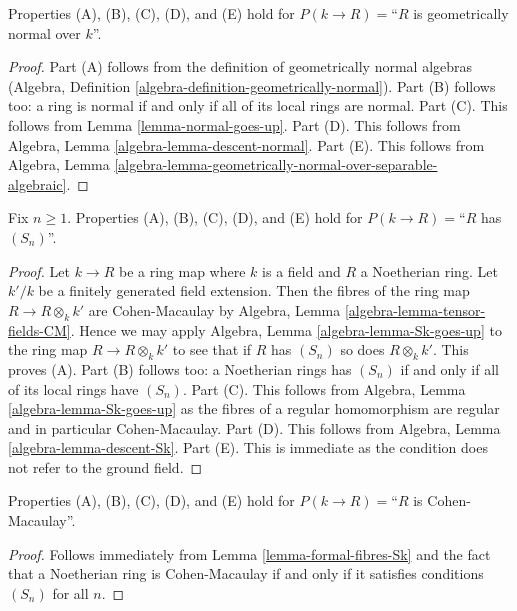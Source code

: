 \begin{lemma}
\label{lemma-formal-fibres-normal}
Properties (A), (B), (C), (D), and (E) hold for
$P(k \to R) =$``$R$ is geometrically normal over $k$''.
\end{lemma}

\begin{proof}
Part (A) follows from the definition of geometrically normal
algebras (Algebra, Definition \ref{algebra-definition-geometrically-normal}).
Part (B) follows too: a ring is normal if and only if all of its
local rings are normal.
Part (C). This follows from Lemma \ref{lemma-normal-goes-up}.
Part (D). This follows from Algebra, Lemma \ref{algebra-lemma-descent-normal}.
Part (E). This follows from Algebra, Lemma
\ref{algebra-lemma-geometrically-normal-over-separable-algebraic}.
\end{proof}

\begin{lemma}
\label{lemma-formal-fibres-Sk}
Fix $n \geq 1$. Properties (A), (B), (C), (D), and (E) hold for
$P(k \to R) =$``$R$ has $(S_n)$''.
\end{lemma}

\begin{proof}
Let $k \to R$ be a ring map where $k$ is a field and $R$ a Noetherian
ring. Let $k'/k$ be a finitely generated field extension.
Then the fibres of the ring map $R \to R \otimes_k k'$ are
Cohen-Macaulay by Algebra, Lemma \ref{algebra-lemma-tensor-fields-CM}.
Hence we may apply Algebra, Lemma \ref{algebra-lemma-Sk-goes-up}
to the ring map $R \to R \otimes_k k'$ to see that if $R$ has $(S_n)$
so does $R \otimes_k k'$. This proves (A).
Part (B) follows too: a Noetherian rings has $(S_n)$ if and only if
all of its local rings have $(S_n)$.
Part (C). This follows from
Algebra, Lemma \ref{algebra-lemma-Sk-goes-up}
as the fibres of a regular homomorphism are regular and in particular
Cohen-Macaulay.
Part (D). This follows from
Algebra, Lemma \ref{algebra-lemma-descent-Sk}.
Part (E). This is immediate as the condition does not refer to
the ground field.
\end{proof}

\begin{lemma}
\label{lemma-formal-fibres-CM}
Properties (A), (B), (C), (D), and (E) hold for
$P(k \to R) =$``$R$ is Cohen-Macaulay''.
\end{lemma}

\begin{proof}
Follows immediately from Lemma \ref{lemma-formal-fibres-Sk}
and the fact that a Noetherian ring is Cohen-Macaulay if
and only if it satisfies conditions $(S_n)$ for all $n$.
\end{proof}

